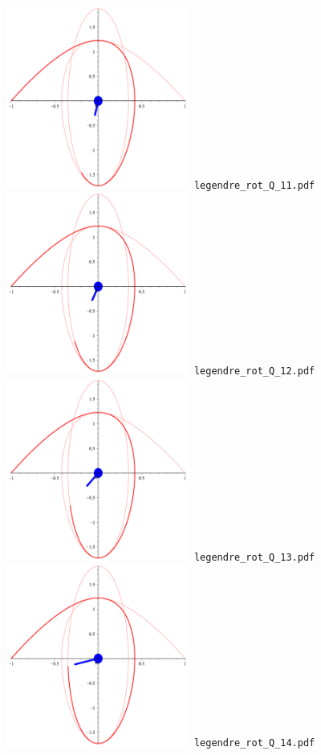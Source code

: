 \documentclass[a4paper]{amsart}
\begin{document}
\includegraphics[width=6cm]{legendre_rot_Q_11.pdf}\verb+ legendre_rot_Q_11.pdf+\\
\includegraphics[width=6cm]{legendre_rot_Q_12.pdf}\verb+ legendre_rot_Q_12.pdf+\\
\includegraphics[width=6cm]{legendre_rot_Q_13.pdf}\verb+ legendre_rot_Q_13.pdf+\\
\includegraphics[width=6cm]{legendre_rot_Q_14.pdf}\verb+ legendre_rot_Q_14.pdf+\\
\end{document}
